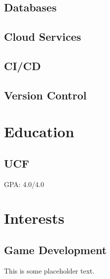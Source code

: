 \documentclass[letterpaper]{resume}
\begin{document}
\begin{minipage}[t]{0.33\textwidth}
\subsection{Databases}

\subsection{Cloud Services}

\subsection{CI/CD}

\subsection{Version Control}

\sectionspace %


\section{Education}

\subsection{UCF}
GPA: 4.0/4.0

\sectionspace %


\section{Interests}

\subsection{Game Development}
This is some placeholder text.

\sectionspace %


\end{minipage} %
\end{document}
